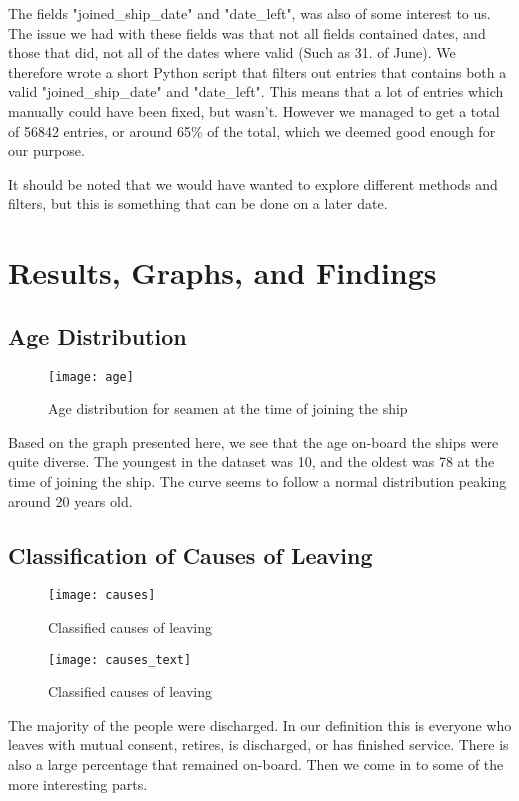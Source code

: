 \documentclass{article}
\begin{document}
The fields "joined\_ship\_date" and "date\_left", was also of some interest to us.
The issue we had with these fields was that not all fields contained dates, and those that did, not all of the dates where valid (Such as 31. of June).
We therefore wrote a short Python script that filters out entries that contains both a valid "joined\_ship\_date" and "date\_left". This means that a lot of entries which manually could have been fixed, but wasn't. However we managed to get a total of 56842 entries, or around 65\% of the total, which we deemed good enough for our purpose.

It should be noted that we would have wanted to explore different methods and filters, but this is something that can be done on a later date.

\section{Results, Graphs, and Findings}

\subsection{Age Distribution}
\begin{figure}[H]
	\centering
    \texttt{[image: age]}
  	\caption{Age distribution for seamen at the time of joining the ship}
\end{figure}

Based on the graph presented here, we see that the age on-board the ships were quite diverse. The youngest in the dataset was 10, and the oldest was 78 at the time of joining the ship. The curve seems to follow a normal distribution peaking around 20 years old.

\subsection{Classification of Causes of Leaving}

\begin{figure}[H]
	\centering
    \texttt{[image: causes]}
  	\caption{Classified causes of leaving}
\end{figure}
\begin{figure}[H]
	\centering
    \texttt{[image: causes\_text]}
  	\caption{Classified causes of leaving}
\end{figure}

The majority of the people were discharged. In our definition this is everyone who leaves with mutual consent, retires, is discharged, or has finished service.
There is also a large percentage that remained on-board.
Then we come in to some of the more interesting parts.
\end{document}
